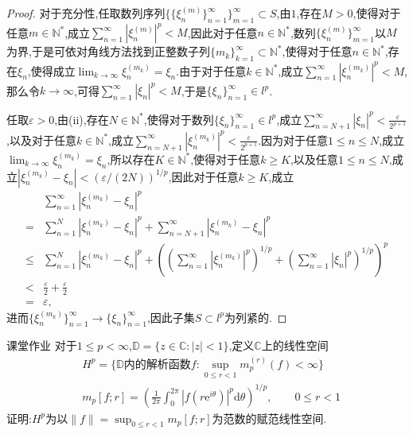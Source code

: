 \documentclass[lang = cn, scheme = chinese]{elegantbook}
\begin{document}
\begin{proof}
		对于充分性,任取数列序列$\{ \{\xi_n^{(m)}\}_{n=1}^\infty \}_{m=1}^{\infty}\subset S$,由$1$,存在$M>0$,使得对于任意$m\in\mathbb{N}^*$,成立$\displaystyle\sum_{n=1}^{\infty}|\xi_n^{(m)}|^p<M$,因此对于任意$n\in\mathbb{N}^*$,数列$\{\xi_n^{(m)}\}_{m=1}^{\infty}$以$M$为界,于是可依对角线方法找到正整数子列$\{m_k\}_{k=1}^{\infty}\subset\mathbb{N}^*$,使得对于任意$n\in\mathbb{N}^*$,存在$\xi_n$,使得成立$\displaystyle\lim_{k\to\infty}\xi_n^{(m_k)}=\xi_n$.由于对于任意$k\in\mathbb{N}^*$,成立$\displaystyle\sum_{n=1}^{\infty}|\xi_n^{(m_k)}|^p<M$,那么令$k\to\infty$,可得$\displaystyle\sum_{n=1}^{\infty}|\xi_n|^p<M$,于是$\{\xi_n\}_{n=1}^{\infty}\in l^p$.
		
		任取$\varepsilon>0$,由(ii),存在$N\in\mathbb{N}^*$,使得对于数列$\{\xi_n\}_{n=1}^{\infty}\in l^p$,成立$\displaystyle\sum_{n=N+1}^{\infty}|\xi_n|^p<\frac{\varepsilon}{2^{p+1}}$,以及对于任意$k\in\mathbb{N}^*$,成立$\displaystyle\sum_{n=N+1}^{\infty}|\xi_n^{(m_k)}|^p<\frac{\varepsilon}{2^{p+1}}$.因为对于任意$1\le n\le N$,成立$\displaystyle\lim_{k\to\infty}\xi_n^{(m_k)}=\xi_n$,所以存在$K\in\mathbb{N}^*$,使得对于任意$k\ge K$,以及任意$1\le n\le N$,成立$|\xi_n^{(m_k)}-\xi_n|<(\varepsilon/(2N))^{1/p}$,因此对于任意$k\ge K$,成立
		\begin{align*}
			& \sum_{n=1}^{\infty}|\xi_n^{(m_k)}-\xi_n|^p\\
			= & \sum_{n=1}^{N}|\xi_n^{(m_k)}-\xi_n|^p+\sum_{n=N+1}^{\infty}|\xi_n^{(m_k)}-\xi_n|^p\\
			\le & \sum_{n=1}^{N}|\xi_n^{(m_k)}-\xi_n|^p+\left(\left( \sum_{n=1}^{\infty}|\xi_n^{(m_k)}|^p \right)^{1/p}+\left( \sum_{n=1}^{\infty}|\xi_n|^p \right)^{1/p}\right)^p\\
			< & \frac{\varepsilon}{2}+\frac{\varepsilon}{2}\\
			= & \varepsilon,
		\end{align*}
		进而$\{ \xi_n^{(m_k)} \}_{n=1}^{\infty}\to \{ \xi_n \}_{n=1}^{\infty}$,因此子集$S\subset l^p$为列紧的.
	\end{proof}
	
	\begin{proposition}{课堂作业}
		对于$1\le p <\infty$,$\mathbb{D}=\{ z\in\mathbb{C}:|z|<1  \}$,定义$\mathbb{C}$上的线性空间
		\begin{align*}
			&H^p=\{ \mathbb{D} \text{内的解析函数} f:\sup_{0\le r <1}m_p^{(r)}(f)<\infty \}\\
			&m_p[f;r]=\left(\frac{1}{2\pi}\int_0^{2\pi}|f(r\mathrm{e}^{i\theta})|^p\mathrm{d}\theta\right)^{1/p},\qquad 0\le r<1
		\end{align*}
		证明:$H^p$为以$\displaystyle\|f\|=\sup_{0\le r<1}m_p[f;r]$为范数的赋范线性空间.
	\end{proposition}
	
\end{document}
